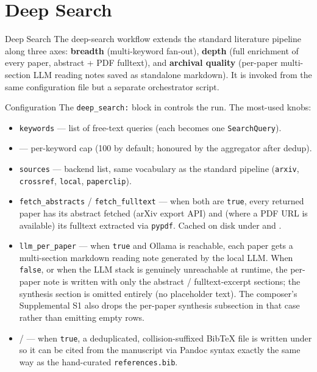 \documentclass[
  ignorenonframetext,
]{beamer}
\author{\texorpdfstring{}{}}
\date{}
\providecommand{\tightlist}{%
  \setlength{\itemsep}{0pt}\setlength{\parskip}{0pt}}
\begin{document}
\section{Deep Search}\label{sec:deep_search}

\begin{frame}[allowframebreaks]{Deep Search}
The deep-search workflow extends the standard literature pipeline along
three axes: \textbf{breadth} (multi-keyword fan-out), \textbf{depth}
(full enrichment of every paper, abstract + PDF fulltext), and
\textbf{archival quality} (per-paper multi-section LLM reading notes
saved as standalone markdown). It is invoked from the same configuration
file but a separate orchestrator script.
\end{frame}

\begin{frame}{Configuration}
\protect{}\label{configuration}
The \texttt{deep\_search:} block in 
controls the run. The most-used knobs:

\begin{itemize}
\tightlist
\item
  \texttt{keywords} --- list of free-text queries (each becomes one
  \texttt{SearchQuery}).
\item
   --- per-keyword cap (100 by
  default; honoured by the aggregator after dedup).
\item
  \texttt{sources} --- backend list, same vocabulary as the standard
  pipeline (\texttt{arxiv}, \texttt{crossref}, \texttt{local},
  \texttt{paperclip}).
\item
  \texttt{fetch\_abstracts} / \texttt{fetch\_fulltext} --- when both are
  \texttt{true}, every returned paper has its abstract fetched (arXiv
  export API) and (where a PDF URL is available) its fulltext extracted
  via \texttt{pypdf}. Cached on disk under 
  and .
\item
  \texttt{llm\_per\_paper} --- when \texttt{true} and Ollama is
  reachable, each paper gets a multi-section markdown reading note
  generated by the local LLM. When \texttt{false}, or when the LLM stack
  is genuinely unreachable at runtime, the per-paper note is written
  with only the abstract / fulltext-excerpt sections; the synthesis
  section is omitted entirely (no placeholder text). The composer's
  Supplemental S1 also drops the per-paper synthesis subsection in that
  case rather than emitting empty rows.
\item
   /  ---
  when \texttt{true}, a deduplicated, collision-suffixed BibTeX file is
  written under  so it can be
  cited from the manuscript via Pandoc \texttt{\breakseq{[@key]}} syntax
  exactly the same way as the hand-curated \texttt{references.bib}.
\end{itemize}
\end{frame}
\end{document}
